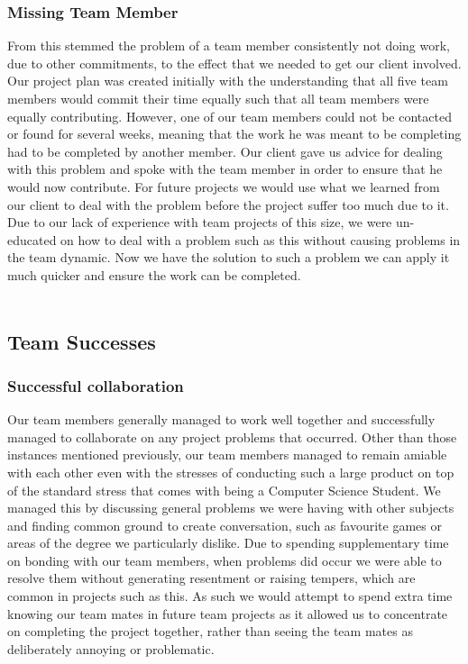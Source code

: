 \subsubsection{Missing Team Member}
From this stemmed the problem of a team member consistently not doing work, due to other commitments, to the effect that we needed to get our client involved. Our project plan was created initially with the understanding that all five team members would commit their time equally such that all team members were equally contributing. However, one of our team members could not be contacted or found for several weeks, meaning that the work he was meant to be completing had to be completed by another member. Our client gave us advice for dealing with this problem and spoke with the team member in order to ensure that he would now contribute. For future projects we would use what we learned from our client to deal with the problem before the project suffer too much due to it. Due to our lack of experience with team projects of this size, we were un-educated on how to deal with a problem such as this without causing problems in the team dynamic. Now we have the solution to such a problem we can apply it much quicker and ensure the work can be completed. \\
\\

\subsection{Team Successes}

\subsubsection{Successful collaboration}
Our team members generally managed to work well together and successfully managed to collaborate on any project problems that occurred. Other than those instances mentioned previously, our team members managed to remain amiable with each other even with the stresses of conducting such a large product on top of the standard stress that comes with being a Computer Science Student. We managed this by discussing general problems we were having with other subjects and finding common ground to create conversation, such as favourite games or areas of the degree we particularly dislike. Due to spending supplementary time on bonding with our team members, when problems did occur we were able to resolve them without generating resentment or raising tempers, which are common in projects such as this. As such we would attempt to spend extra time knowing our team mates in future team projects as it allowed us to concentrate on completing the project together, rather than seeing the team mates as deliberately annoying or problematic.\\
\\
